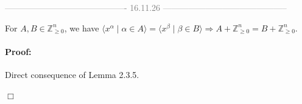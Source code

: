 \begin{center}
  \textcolor{gray}{------------------------------------------- 16.11.26 --------------------------------------------} \\[0.3em]
\end{center}
\vspace{0.3em}

\begin{center}
\end{center}

\begin{corollary}[title = Corollary 2.3.6]
    For $A, B \in \mathbb{Z}^n_{\geq 0}$, we have $\langle x^{\alpha} \mid \alpha \in A  \rangle= \langle x^{\beta} \mid \beta \in B\rangle \Rightarrow A + \mathbb{Z}^n_{\geq 0} = B + \mathbb{Z}^n_{\geq 0}$. 
    \paragraph{Proof:} Direct consequence of Lemma 2.3.5.
      \begin{flushright}
        $\Box $
      \end{flushright}
\end{corollary}


